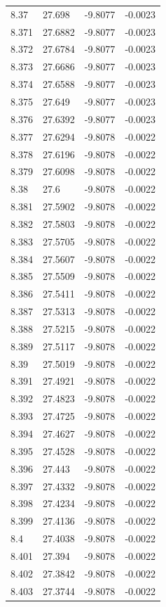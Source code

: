 \begin{tabular}{llll}
8.37 & 27.698 & -9.8077 & -0.0023 \\
8.371 & 27.6882 & -9.8077 & -0.0023 \\
8.372 & 27.6784 & -9.8077 & -0.0023 \\
8.373 & 27.6686 & -9.8077 & -0.0023 \\
8.374 & 27.6588 & -9.8077 & -0.0023 \\
8.375 & 27.649 & -9.8077 & -0.0023 \\
8.376 & 27.6392 & -9.8077 & -0.0023 \\
8.377 & 27.6294 & -9.8078 & -0.0022 \\
8.378 & 27.6196 & -9.8078 & -0.0022 \\
8.379 & 27.6098 & -9.8078 & -0.0022 \\
8.38 & 27.6 & -9.8078 & -0.0022 \\
8.381 & 27.5902 & -9.8078 & -0.0022 \\
8.382 & 27.5803 & -9.8078 & -0.0022 \\
8.383 & 27.5705 & -9.8078 & -0.0022 \\
8.384 & 27.5607 & -9.8078 & -0.0022 \\
8.385 & 27.5509 & -9.8078 & -0.0022 \\
8.386 & 27.5411 & -9.8078 & -0.0022 \\
8.387 & 27.5313 & -9.8078 & -0.0022 \\
8.388 & 27.5215 & -9.8078 & -0.0022 \\
8.389 & 27.5117 & -9.8078 & -0.0022 \\
8.39 & 27.5019 & -9.8078 & -0.0022 \\
8.391 & 27.4921 & -9.8078 & -0.0022 \\
8.392 & 27.4823 & -9.8078 & -0.0022 \\
8.393 & 27.4725 & -9.8078 & -0.0022 \\
8.394 & 27.4627 & -9.8078 & -0.0022 \\
8.395 & 27.4528 & -9.8078 & -0.0022 \\
8.396 & 27.443 & -9.8078 & -0.0022 \\
8.397 & 27.4332 & -9.8078 & -0.0022 \\
8.398 & 27.4234 & -9.8078 & -0.0022 \\
8.399 & 27.4136 & -9.8078 & -0.0022 \\
8.4 & 27.4038 & -9.8078 & -0.0022 \\
8.401 & 27.394 & -9.8078 & -0.0022 \\
8.402 & 27.3842 & -9.8078 & -0.0022 \\
8.403 & 27.3744 & -9.8078 & -0.0022 \\

\end{tabular}
